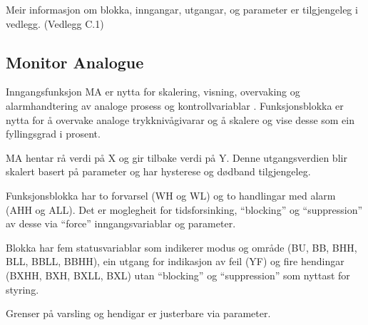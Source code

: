 Meir informasjon om blokka, inngangar, utgangar, og parameter er tilgjengeleg i vedlegg. (Vedlegg C.1)

\newpage

\subsection{Monitor Analogue}
Inngangsfunksjon \gls{MA} er nytta for skalering, visning, overvaking og alarmhandtering av
analoge prosess og kontrollvariablar \citep{IEC-63131}.
Funksjonsblokka er nytta for å overvake analoge trykknivågivarar 
og å skalere og vise desse som ein fyllingsgrad i prosent.

\gls{MA} hentar rå verdi på X og gir tilbake verdi på Y.
Denne utgangsverdien blir skalert basert på parameter og har hysterese og dødband tilgjengeleg.

Funksjonsblokka har to forvarsel (WH og WL) og to handlingar med alarm (AHH og ALL).
Det er moglegheit for tidsforsinking, ``blocking'' og ``suppression'' av desse via ``force'' inngangsvariablar og parameter.

Blokka har fem statusvariablar som indikerer modus og område (BU, BB, BHH, BLL, BBLL, BBHH), ein utgang for indikasjon av feil (YF)
og fire hendingar (BXHH, BXH, BXLL, BXL) utan ``blocking'' og ``suppression'' som nyttast for styring.

Grenser på varsling og hendigar er justerbare via parameter. \newline \newline \newline

